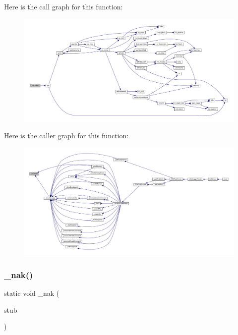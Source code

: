 Here is the call graph for this function\+:
\nopagebreak
\begin{figure}[H]
\begin{center}
\leavevmode
\includegraphics[width=350pt]{gdb-stub_8c_ad3195dd3a3a4e1fcdb8368c6c8372a08_cgraph}
\end{center}
\end{figure}
Here is the caller graph for this function\+:
\nopagebreak
\begin{figure}[H]
\begin{center}
\leavevmode
\includegraphics[width=350pt]{gdb-stub_8c_ad3195dd3a3a4e1fcdb8368c6c8372a08_icgraph}
\end{center}
\end{figure}
\mbox{\label{gdb-stub_8c_a36136f8c4944f09ed1670d80a19fa31a}} 
\subsubsection{\texorpdfstring{\+\_\+nak()}{\_nak()}}
{\footnotesize\ttfamily static void \+\_\+nak (\begin{DoxyParamCaption}\item[{struct G\+D\+B\+Stub $\ast$}]{stub }\end{DoxyParamCaption})\hspace{0.3cm}{\ttfamily [static]}}

